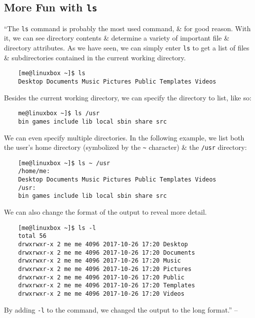 \documentclass[oneside]{book}
\numberwithin{equation}{section}
\begin{document}
\subsection{More Fun with \texttt{ls}}
``The \texttt{ls} command is probably the most used command, \& for good reason. With it, we can see directory contents \& determine a variety of important file \& directory attributes. As we have seen, we can simply enter \texttt{ls} to get a list of files \& subdirectories contained in the current working directory.
\begin{verbatim}
	[me@linuxbox ~]$ ls
	Desktop Documents Music Pictures Public Templates Videos
\end{verbatim}
Besides the current working directory, we can specify the directory to list, like so:
\begin{verbatim}
	me@linuxbox ~]$ ls /usr
	bin games include lib local sbin share src
\end{verbatim}
We can even specify multiple directories. In the following example, we list both the user's home directory (symbolized by the \verb|~| character) \& the \texttt{/usr} directory:
\begin{verbatim}
	[me@linuxbox ~]$ ls ~ /usr
	/home/me:
	Desktop Documents Music Pictures Public Templates Videos
	/usr:
	bin games include lib local sbin share src
\end{verbatim}
We can also change the format of the output to reveal more detail.
\begin{verbatim}
	[me@linuxbox ~]$ ls -l
	total 56
	drwxrwxr-x 2 me me 4096 2017-10-26 17:20 Desktop
	drwxrwxr-x 2 me me 4096 2017-10-26 17:20 Documents
	drwxrwxr-x 2 me me 4096 2017-10-26 17:20 Music
	drwxrwxr-x 2 me me 4096 2017-10-26 17:20 Pictures
	drwxrwxr-x 2 me me 4096 2017-10-26 17:20 Public
	drwxrwxr-x 2 me me 4096 2017-10-26 17:20 Templates
	drwxrwxr-x 2 me me 4096 2017-10-26 17:20 Videos
\end{verbatim}
By adding \texttt{-l} to the command, we changed the output to the long format.'' -- \cite[pp. 50--51]{Shotts2019}
\end{document}
